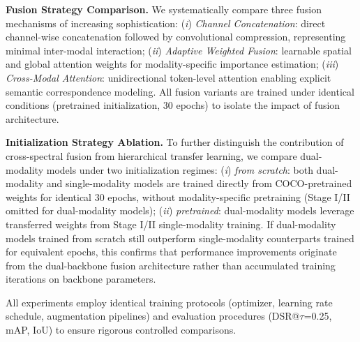 \textbf{Fusion Strategy Comparison.} We systematically compare three fusion mechanisms of increasing sophistication: (\textit{i}) \textit{Channel Concatenation}: direct channel-wise concatenation followed by convolutional compression, representing minimal inter-modal interaction; (\textit{ii}) \textit{Adaptive Weighted Fusion}: learnable spatial and global attention weights for modality-specific importance estimation; (\textit{iii}) \textit{Cross-Modal Attention}: unidirectional token-level attention enabling explicit semantic correspondence modeling. All fusion variants are trained under identical conditions (pretrained initialization, 30 epochs) to isolate the impact of fusion architecture.

\textbf{Initialization Strategy Ablation.} To further distinguish the contribution of cross-spectral fusion from hierarchical transfer learning, we compare dual-modality models under two initialization regimes: (\textit{i}) \textit{from scratch}: both dual-modality and single-modality models are trained directly from COCO-pretrained weights for identical 30 epochs, without modality-specific pretraining (Stage I/II omitted for dual-modality models); (\textit{ii}) \textit{pretrained}: dual-modality models leverage transferred weights from Stage I/II single-modality training. If dual-modality models trained from scratch still outperform single-modality counterparts trained for equivalent epochs, this confirms that performance improvements originate from the dual-backbone fusion architecture rather than accumulated training iterations on backbone parameters.

All experiments employ identical training protocols (optimizer, learning rate schedule, augmentation pipelines) and evaluation procedures (DSR@$\tau$=0.25, mAP, IoU) to ensure rigorous controlled comparisons.